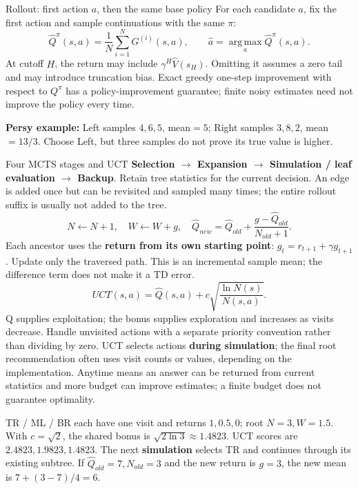 \documentclass[10pt,a4paper]{article}
\newcommand{\argmax}{\operatorname*{arg\,max}}
\begin{document}
\begin{card}{Rollout: first action $a$, then the same base policy}
For each candidate $a$, fix the first action and sample continuations with the same $\pi$:
\[
\hat Q^\pi(s,a)=\frac1N\sum_{i=1}^NG^{(i)}(s,a),\qquad
\hat a=\argmax_a\hat Q^\pi(s,a).
\]
At cutoff $H$, the return may include $\gamma^H\hat V(s_H)$. Omitting it assumes a zero tail and may introduce truncation bias.
Exact greedy one-step improvement with respect to $Q^\pi$ has a policy-improvement guarantee; finite noisy estimates need not improve the policy every time.

\textbf{Persy example:} Left samples $4,6,5$, mean$=5$; Right samples $3,8,2$, mean$=13/3$. Choose Left, but three samples do not prove its true value is higher.
\end{card}

\begin{card}{Four MCTS stages and UCT}
\textbf{Selection $\to$ Expansion $\to$ Simulation / leaf evaluation $\to$ Backup}. Retain tree statistics for the current decision. An edge is added once but can be revisited and sampled many times; the entire rollout suffix is usually not added to the tree.
\[
N\leftarrow N+1,\quad W\leftarrow W+g,\quad
\hat Q_{new}=\hat Q_{old}+\frac{g-\hat Q_{old}}{N_{old}+1}.
\]
Each ancestor uses the \textbf{return from its own starting point}: $g_t=r_{t+1}+\gamma g_{t+1}$. Update only the traversed path. This is an incremental sample mean; the difference term does not make it a TD error.
\[
\boxed{UCT(s,a)=\hat Q(s,a)+c\sqrt{\frac{\ln N(s)}{N(s,a)}}.}
\]
Q supplies exploitation; the bonus supplies exploration and increases as visits decrease. Handle unvisited actions with a separate priority convention rather than dividing by zero. UCT selects actions \textbf{during simulation}; the final root recommendation often uses visit counts or values, depending on the implementation.
Anytime means an answer can be returned from current statistics and more budget can improve estimates; a finite budget does not guarantee optimality.
\end{card}

\begin{idea}
TR / ML / BR each have one visit and returns $1,0.5,0$; root $N=3,W=1.5$. With $c=\sqrt2$, the shared bonus is $\sqrt{2\ln3}\approx1.4823$. UCT scores are $2.4823,1.9823,1.4823$. The next \textbf{simulation} selects TR and continues through its existing subtree.
If $\hat Q_{old}=7,N_{old}=3$ and the new return is $g=3$, the new mean is $7+(3-7)/4=6$.
\end{idea}
\end{document}
